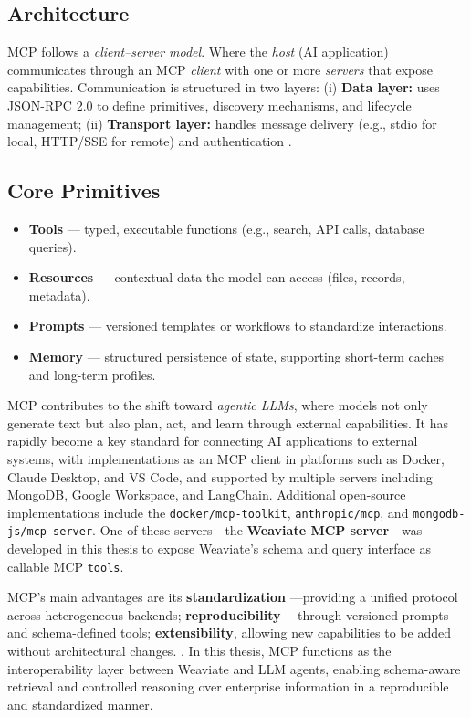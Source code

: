 \subsection{Architecture} 
MCP follows a \textit{client--server model}. Where the \textit{host} (AI application) communicates through an MCP \textit{client} with one or more \textit{servers} that expose capabilities. Communication is structured in two layers:
(i) \textbf{Data layer:} uses JSON-RPC 2.0 to define primitives, discovery mechanisms, and lifecycle management;
(ii) \textbf{Transport layer:} handles message delivery (e.g., stdio for local, HTTP/SSE for remote) and authentication \cite{mcp-architecture}.


\subsection{Core Primitives} 
\begin{itemize}
  \item \textbf{Tools} --- typed, executable functions (e.g., search, API calls, database queries).
  \item \textbf{Resources} --- contextual data the model can access (files, records, metadata).
  \item \textbf{Prompts} --- versioned templates or workflows to standardize interactions.
  \item \textbf{Memory} --- structured persistence of state, supporting short-term caches and long-term profiles.
\end{itemize}

MCP contributes to the shift toward \textit{agentic LLMs}, where models not only generate text but also plan, act, and learn through external capabilities.  
It has rapidly become a key standard for connecting AI applications to external systems, with implementations as an MCP client in platforms such as Docker, Claude Desktop, and VS Code, and supported by multiple servers including MongoDB, Google Workspace, and LangChain.  
Additional open-source implementations include the \texttt{docker/mcp-toolkit}, \texttt{anthropic/mcp}, and \texttt{mongodb-js/mcp-server}.  
One of these servers—the \textbf{Weaviate MCP server}—was developed in this thesis to expose Weaviate’s schema and query interface as callable MCP \texttt{tools}.  

MCP’s main advantages are its \textbf{standardization} —providing a unified protocol across heterogeneous backends; \textbf{reproducibility}— through versioned prompts and schema-defined tools; \textbf{extensibility}, allowing new capabilities to be added without architectural changes. \cite{mcp-spec}.  
In this thesis, MCP functions as the interoperability layer between Weaviate and LLM agents, enabling schema-aware retrieval and controlled reasoning over enterprise information in a reproducible and standardized manner.


